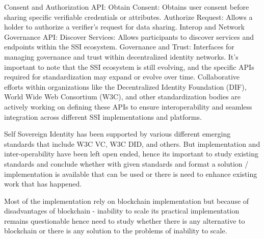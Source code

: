 Consent and Authorization API:
Obtain Consent: Obtains user consent before sharing specific verifiable credentials or attributes.
Authorize Request: Allows a holder to authorize a verifier's request for data sharing.
Interop and Network Governance API:
Discover Services: Allows participants to discover services and endpoints within the SSI ecosystem.
Governance and Trust: Interfaces for managing governance and trust within decentralized identity networks.
It's important to note that the SSI ecosystem is still evolving, and the specific APIs required for standardization may expand or evolve over time. Collaborative efforts within organizations like the Decentralized Identity Foundation (DIF), World Wide Web Consortium (W3C), and other standardization bodies are actively working on defining these APIs to ensure interoperability and seamless integration across different SSI implementations and platforms.
\par Self Sovereign Identity has been supported by various different emerging standards that include W3C VC, W3C DID, and others. But implementation and inter-operability have been left open ended, hence its important to study existing standards and conclude whether with given standards and format a solution / implementation is available that can be used or there is need to enhance existing work that has happened.
\par Most of the implementation rely on blockchain implementation but because of disadvantages of blockchain - inability to scale its practical implementation remains questionable hence need to study whether there is any alternative to blockchain or there is any solution to the problems of inability to scale.